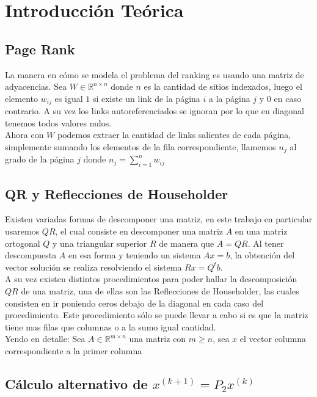 \section{Introducción Teórica}

\subsection{Page Rank}

La manera en cómo se modela el problema del ranking es usando una matriz de adyacencias. Sea $W \in \mathbb{R}^{n \times n}$ donde $n$ es la cantidad de sitios indexados, luego el elemento $w_{ij}$ es igual $1$ si existe un link de la página $i$ a la página $j$ y $0$ en caso contrario. A su vez los links autoreferenciados se ignoran por lo que en diagonal tenemos todos valores nulos.\\

Ahora con $W$ podemos extraer la cantidad de links salientes de cada página, simplemente sumando los elementos de la fila correspondiente, llamemos $n_j$ al grado de la página $j$ donde $n_j = \sum^{n}_{i = 1} w_{ij}$

\subsection{QR y Reflecciones de Householder}

Existen variadas formas de descomponer una matriz, en este trabajo en particular usaremos $QR$, el cual consiste en descomponer una matriz $A$ en una matriz ortogonal $Q$ y una triangular superior $R$ de manera que $A = QR$. Al tener descompuesta $A$ en esa forma y teniendo un sistema $Ax = b$, la obtención del vector solución se realiza resolviendo el sistema $Rx = Q^{t}b$.\\

A su vez existen distintos procedimientos para poder hallar la descomposición $QR$ de una matriz, una de ellas son las Reflecciones de Householder, las cuales consisten en ir poniendo ceros debajo de la diagonal en cada caso del procedimiento. Este procedimiento sólo se puede llevar a cabo si es que la matriz tiene mas filas que columnas o a la sumo igual cantidad.\\

Yendo en detalle: Sea $A \in \mathbb{R}^{m \times n}$ una matriz con $m \ge n$, sea $x$ el vector columna correspondiente a la primer columna



\subsection{Cálculo alternativo de $x^{(k + 1)} = P_2x^{(k)}$}

